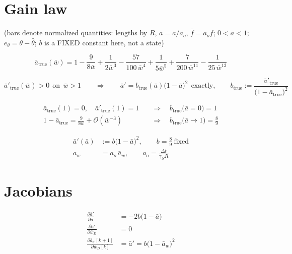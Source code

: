 \documentclass[11pt,a4paper,fontset=none]{ctexart}
\newcommand{\ba}{\bar{a}}
\newcommand{\bw}{\bar{w}}
\newcommand{\bwD}{\bar{w}_D}
\begin{document}
\section{Gain law}

(bars denote normalized quantities: lengths by $R$, $\ba = a/a_o$,
$\bar{f} = a_o f$; $0 < \ba < 1$; $e_{\theta} = \theta - \hat{\theta}$;
$b$ is a FIXED constant here, not a state)

\begin{equation*}
\ba_{\mathrm{true}}(\bw) = 1 - \frac{9}{8\bw} + \frac{1}{2\bw^{3}}
  - \frac{57}{100\,\bw^{4}} + \frac{1}{5\bw^{5}}
  + \frac{7}{200\,\bw^{11}} - \frac{1}{25\,\bw^{12}}
\end{equation*}

\begin{equation*}
\ba'_{\mathrm{true}}(\bw) > 0 \ \ \text{on} \ \ \bw > 1
\qquad\Longrightarrow\qquad
\ba' = b_{\mathrm{true}}(\ba)\bigl(1-\ba\bigr)^{2}
\ \ \text{exactly},
\qquad
b_{\mathrm{true}} := \frac{\ba'_{\mathrm{true}}}
  {\bigl(1-\ba_{\mathrm{true}}\bigr)^{2}}
\end{equation*}

\begin{align*}
\ba_{\mathrm{true}}(1) = 0, \quad \ba'_{\mathrm{true}}(1) = 1
  &\quad\Longrightarrow\quad b_{\mathrm{true}}\bigl(\ba = 0\bigr) = 1 \\
1 - \ba_{\mathrm{true}} = \frac{9}{8\bw} + \mathcal{O}(\bw^{-3})
  &\quad\Longrightarrow\quad b_{\mathrm{true}}\bigl(\ba \to 1\bigr) = \frac{8}{9}
\end{align*}

\begin{align*}
\ba'(\ba) &:= b\bigl(1-\ba\bigr)^{2} , \qquad b = \tfrac{8}{9} \ \text{fixed} \\
a_w &= a_o\,\ba_w , \qquad a_o = \frac{\Delta t}{\gamma_N R}
\end{align*}

\section{Jacobians}

\begin{align*}
\frac{\partial \ba'}{\partial \ba}   &= -2b\bigl(1-\ba\bigr) \\
\frac{\partial \ba'}{\partial \bwD}  &= 0 \\
\frac{\partial \ba_w[k+1]}{\partial \bwD[k]} &= \ba'
  = b\bigl(1-\ba_w\bigr)^{2}
\end{align*}
\end{document}
